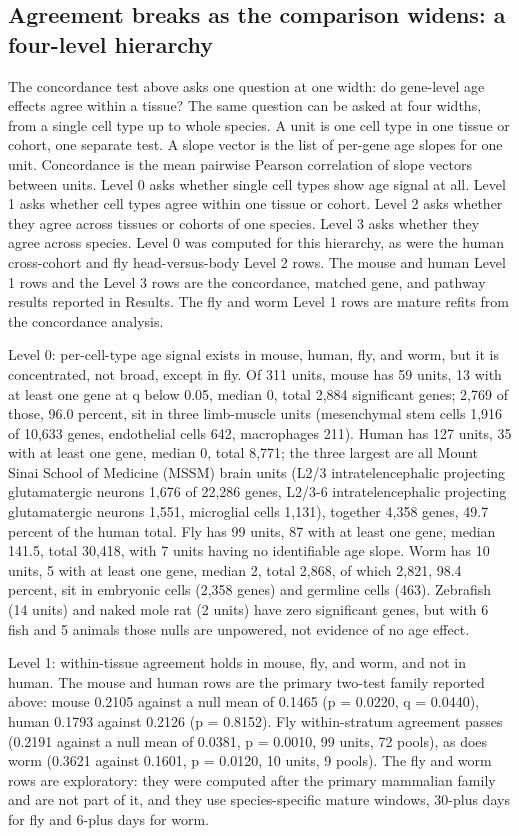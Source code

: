 \documentclass[11pt]{article}
\begin{document}
\subsection*{Agreement breaks as the comparison widens: a four-level hierarchy}

The concordance test above asks one question at one width: do gene-level age effects agree within a tissue? The same question can be asked at four widths, from a single cell type up to whole species. A unit is one cell type in one tissue or cohort, one separate test. A slope vector is the list of per-gene age slopes for one unit. Concordance is the mean pairwise Pearson correlation of slope vectors between units. Level 0 asks whether single cell types show age signal at all. Level 1 asks whether cell types agree within one tissue or cohort. Level 2 asks whether they agree across tissues or cohorts of one species. Level 3 asks whether they agree across species. Level 0 was computed for this hierarchy, as were the human cross-cohort and fly head-versus-body Level 2 rows. The mouse and human Level 1 rows and the Level 3 rows are the concordance, matched gene, and pathway results reported in Results. The fly and worm Level 1 rows are mature refits from the concordance analysis.

Level 0: per-cell-type age signal exists in mouse, human, fly, and worm, but it is concentrated, not broad, except in fly. Of 311 units, mouse has 59 units, 13 with at least one gene at q below 0.05, median 0, total 2,884 significant genes; 2,769 of those, 96.0 percent, sit in three limb-muscle units (mesenchymal stem cells 1,916 of 10,633 genes, endothelial cells 642, macrophages 211). Human has 127 units, 35 with at least one gene, median 0, total 8,771; the three largest are all Mount Sinai School of Medicine (MSSM) brain units (L2/3 intratelencephalic projecting glutamatergic neurons 1,676 of 22,286 genes, L2/3-6 intratelencephalic projecting glutamatergic neurons 1,551, microglial cells 1,131), together 4,358 genes, 49.7 percent of the human total. Fly has 99 units, 87 with at least one gene, median 141.5, total 30,418, with 7 units having no identifiable age slope. Worm has 10 units, 5 with at least one gene, median 2, total 2,868, of which 2,821, 98.4 percent, sit in embryonic cells (2,358 genes) and germline cells (463). Zebrafish (14 units) and naked mole rat (2 units) have zero significant genes, but with 6 fish and 5 animals those nulls are unpowered, not evidence of no age effect.

Level 1: within-tissue agreement holds in mouse, fly, and worm, and not in human. The mouse and human rows are the primary two-test family reported above: mouse 0.2105 against a null mean of 0.1465 (p = 0.0220, q = 0.0440), human 0.1793 against 0.2126 (p = 0.8152). Fly within-stratum agreement passes (0.2191 against a null mean of 0.0381, p = 0.0010, 99 units, 72 pools), as does worm (0.3621 against 0.1601, p = 0.0120, 10 units, 9 pools). The fly and worm rows are exploratory: they were computed after the primary mammalian family and are not part of it, and they use species-specific mature windows, 30-plus days for fly and 6-plus days for worm.
\end{document}
